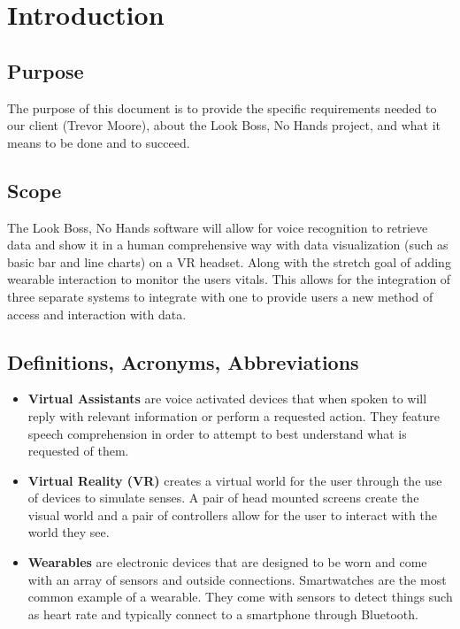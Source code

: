 \documentclass[onecolumn, draftclsnofoot,10pt, compsoc]{IEEEtran}
\begin{document}
\begin{titlepage}
\begin{singlespace}
\begin{abstract}
        \end{abstract}
    \end{singlespace}
\end{titlepage}
\newpage
{}
\tableofcontents
\clearpage


\section{Introduction}
    \subsection{Purpose}
        The purpose of this document is to provide the specific requirements needed to our client (Trevor Moore), about the Look Boss, No Hands project, and what it means to be done and to succeed.

    \subsection{Scope}
        The Look Boss, No Hands software will allow for voice recognition to retrieve data and show it in a human comprehensive way with data visualization (such as basic bar and line charts) on a VR headset. Along with the stretch goal of adding wearable interaction to monitor the users vitals.  This allows for the integration of three separate systems to integrate with one to provide users a new method of access and interaction with data.

    \subsection{Definitions, Acronyms, Abbreviations}

        \begin{itemize}
            \item \textbf{Virtual Assistants} are voice activated devices that when spoken to will reply with relevant information or perform a requested action. They feature speech comprehension in order to attempt to best understand what is requested of them.\cite{def_ai}
            \item \textbf{Virtual Reality (VR)} creates a virtual world for the user through the use of devices to simulate senses. A pair of head mounted screens create the visual world and a pair of controllers allow for the user to interact with the world they see.\cite{def_vr}
            \item \textbf{Wearables} are electronic devices that are designed to be worn and come with an array of sensors and outside connections. Smartwatches are the most common example of a wearable. They come with sensors to detect things such as heart rate and typically connect to a smartphone through Bluetooth.\cite{def_wear}
        \end{itemize}
\end{document}
